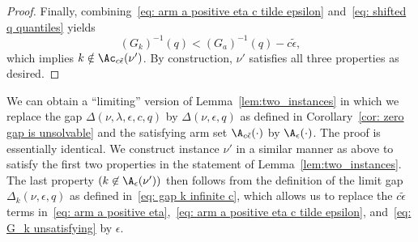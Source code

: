 \begin{proof}
     Finally, combining~\eqref{eq: arm a positive eta c tilde epsilon} and~\eqref{eq: shifted q quantiles} yields
     \begin{equation}
     \label{eq: G_k unsatisfying}
          (G_k)^{-1}(q) 
         < 
         (G_a)^{-1}(q) - c\tilde{\epsilon},
     \end{equation}
     which implies $k \notin \Ac_{c \tilde{\epsilon} }(\nu')$. 
     By construction, $\nu'$ satisfies all three properties as desired.
\end{proof}


\begin{remark}
\label{rem: limit version of two instance lemma}
     We can obtain a ``limiting'' version of Lemma~\ref{lem:two_instances} in which we replace the gap $\Delta(\nu, \lambda, \epsilon, c, q)$ by $\Delta(\nu, \epsilon, q)$ as defined in Corollary~\ref{cor: zero gap is unsolvable} and the satisfying arm set $\A_{c \tilde{\epsilon}}(\cdot)$
     by $\A_{\epsilon}(\cdot)$.
     The proof is essentially identical.
     We construct instance $\nu'$ in a similar manner as above to satisfy the first two properties in the statement of Lemma~\ref{lem:two_instances}.
     The last property $(k \not\in \A_{\epsilon}(\nu'))$ then follows from the definition of the limit gap $\Delta_{k}(\nu, \epsilon, 
    q)$ as defined in~\eqref{eq: gap k infinite c}, which allows us to replace the $c\tilde{\epsilon}$ terms in~\eqref{eq: arm a positive eta},~\eqref{eq: arm a positive eta c tilde epsilon}, and~\eqref{eq: G_k unsatisfying} by $\epsilon$.    
\end{remark}


